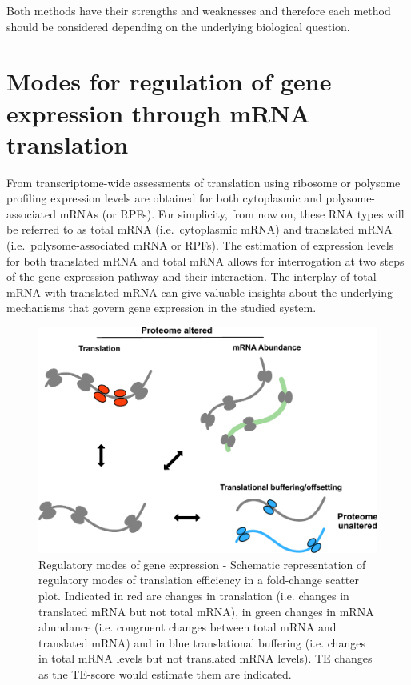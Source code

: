 \documentclass[12pt,openany]{book}
\begin{document}
Both methods have their strengths and weaknesses and therefore each
method should be considered depending on the underlying biological
question. \newline
\section{Modes for regulation of gene expression through mRNA translation} \label{modes}

From transcriptome-wide assessments of translation using ribosome or
polysome profiling expression levels are obtained for both cytoplasmic
and polysome-associated mRNAs (or RPFs). For simplicity, from now on,
these RNA types will be referred to as total mRNA (i.e.~cytoplasmic
mRNA) and translated mRNA (i.e.~polysome-associated mRNA or RPFs). The
estimation of expression levels for both translated mRNA and total mRNA
allows for interrogation at two steps of the gene expression pathway and
their interaction. The interplay of total mRNA with translated mRNA can
give valuable insights about the underlying mechanisms that govern gene
expression in the studied system.

\begin{figure}
  \includegraphics{./figures/geneModes_MRNA.pdf}
  \caption{Regulatory modes of gene expression - Schematic representation of regulatory modes of translation efficiency in a fold-change scatter plot. Indicated in red are changes in translation (i.e. changes in translated mRNA but not total mRNA), in green changes in mRNA abundance (i.e. congruent changes between total mRNA and translated mRNA) and in blue translational buffering (i.e. changes in total mRNA levels but not translated mRNA levels). TE changes as the TE-score would estimate them are indicated.\label{fig:modes}}
\end{figure}
\end{document}
